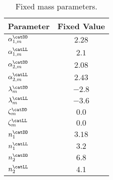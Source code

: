 \begin{table}[h]
\caption{Fixed mass parameters.}
\label{tab:app:measurement_of_sin2beta:cpv_measurement:fixed_parameters:mass}
\centering
\begin{tabular}{lr@{$\,\pm\,$}l}
  \toprule
  Parameter                     & \multicolumn{2}{c}{Fixed Value} \\
  \midrule
  $\alpha_{1,m}^\text{\catDD}$      & \multicolumn{2}{c}{$2.28$}\\
  $\alpha_{1,m}^\text{\catLL}$      & \multicolumn{2}{c}{$2.1$}\\
  $\alpha_{2,m}^\text{\catDD}$      & \multicolumn{2}{c}{$2.08$}\\
  $\alpha_{2,m}^\text{\catLL}$      & \multicolumn{2}{c}{$2.43$}\\
  $\lambda_m^\text{\catDD}$         & \multicolumn{2}{c}{$-2.8$}\\
  $\lambda_m^\text{\catLL}$         & \multicolumn{2}{c}{$-3.6$}\\
  $\zeta_m^\text{\catDD}$           & \multicolumn{2}{c}{$0.0$}\\
  $\zeta_m^\text{\catLL}$           & \multicolumn{2}{c}{$0.0$}\\
  $n_1^\text{\catDD}$               & \multicolumn{2}{c}{$3.18$}\\
  $n_1^\text{\catLL}$               & \multicolumn{2}{c}{$3.2$}\\
  $n_2^\text{\catDD}$               & \multicolumn{2}{c}{$6.8$}\\
  $n_2^\text{\catLL}$               & \multicolumn{2}{c}{$4.1$}\\
  \bottomrule
\end{tabular}
\end{table}
%
